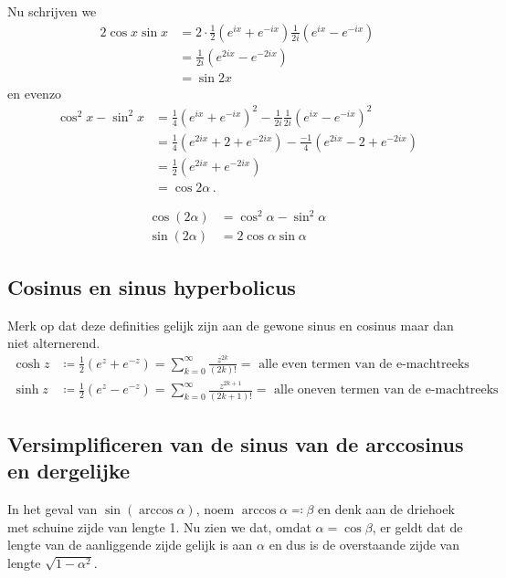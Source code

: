 \documentclass{article}
\begin{document}
		 Nu schrijven we
		 \begin{align*}
			2 \cos x \sin x &= 2 \cdot \frac 1 2 \left( e^{i x} + e^{-ix} \right) \frac 1 {2i} \left( e^{ix} - e^{-ix} \right) \\
			&= \frac 1 {2i} \left(e^{2 i x} - e^{-2ix} \right) \\
			&= \sin 2 x
		\end{align*}
		en evenzo
		 \begin{align*}
			\cos^2 x - \sin^2 x &= \frac 1 4 \left( e^{ix} + e^{-ix} \right)^2  - \frac 1 {2i} \frac 1 {2i} \left( e^{ix} - e^{-ix} \right)^2 \\
			&= \frac 1 4 \left( e^{2ix} + 2 + e^{-2ix} \right) - \frac {-1} {4} \left( e^{2ix} - 2 + e^{-2ix} \right) \\
			&= \frac {1} {2} \left( e^{2ix} + e^{-2ix} \right) \\
			&= \cos 2\alpha \,.
		\end{align*}

 		 \begin{align*}
			 \cos (2\alpha) &= \cos^2 \alpha - \sin^2 \alpha \\
			 \sin (2\alpha) &= 2 \cos \alpha \sin \alpha
		 \end{align*}

	\subsection{Cosinus en sinus hyperbolicus}
		Merk op dat deze definities gelijk zijn aan de gewone sinus en cosinus maar dan niet alternerend.
		\begin{align*}
			\cosh z &\coloneqq \frac{1}{2} (e^z + e^{-z}) = \sum_{k=0}^\infty \frac{z^{2k}}{(2k)!} = \text{ alle even termen van de e-machtreeks} \\
			\sinh z &\coloneqq \frac{1}{2} (e^z - e^{-z}) = \sum_{k=0}^\infty \frac{z^{2k+1}}{(2k+1)!} = \text{ alle oneven termen van de e-machtreeks}
		\end{align*}

	\subsection{Versimplificeren van de sinus van de arccosinus en dergelijke}

	In het geval van $\sin (\arccos \alpha)$, noem $\arccos \alpha \eqqcolon \beta$ en denk aan de driehoek met schuine zijde van lengte 1. Nu zien we dat, omdat $\alpha = \cos \beta$, er geldt dat de lengte van de aanliggende zijde gelijk is aan $\alpha$ en dus is de overstaande zijde van lengte $\sqrt{1-\alpha^2}$.
\end{document}
